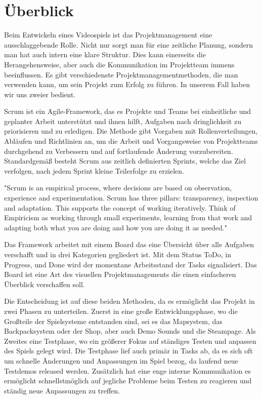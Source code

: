 
\section{Überblick}\label{sec:ueberblick}

\renewcommand{\kapitelautor}{Autor: Nils} %

%
Beim Entwickeln eines Videospiels ist das Projektmanagement eine ausschlaggebende Rolle. Nicht nur sorgt man für eine zeitliche Planung, sondern man hat auch intern eine klare Struktur.
Dies kann einerseits die Herangehensweise, aber auch die Kommunikation im Projektteam immens beeinflussen. Es gibt verschiedenste Projektmanagementmethoden, die man verwenden kann, um sein Projekt zum Erfolg zu führen.
In unserem Fall haben wir uns zweier bedient.

Scrum ist ein Agile-Framework, das es Projekte und Teams bei einheitliche und geplanter Arbeit unterstützt und ihnen hilft, Aufgaben nach dringlichkeit zu priorisieren und zu erledigen.
Die Methode gibt Vorgaben mit Rollenverteilungen, Abläufen und Richtlinien an, um die Arbeit und Vorgangsweise von Projektteams durchgehend zu Verbessern und auf fortlaufende Änderung vorzubereiten.
Standardgemäß besteht Scrum aus zeitlich definierten Sprints, welche das Ziel verfolgen, nach jedem Sprint kleine Teilerfolge zu erzielen.

"Scrum is an empirical process, where decisions are based on observation, experience and experimentation. 
Scrum has three pillars: transparency, inspection and adaptation. This supports the concept of working iteratively. 
Think of Empiricism as working through small experiments, learning from that work and adapting both what you are doing and how you are doing it as needed."\cite{Scrum}


Das Framework arbeitet mit einem Board das eine Übersicht über alle Aufgaben verschafft und in drei Kategorien gegliedert ist.
Mit dem Status ToDo, in Progress, und Done wird der momentane Arbeitsstand der Tasks signalisiert. Das Board ist eine Art des visuellen Projektmanagements die einen einfacheren Überblick verschaffen soll.\cite{AsanaKanban}

 Die Entscheidung ist auf diese beiden Methoden, da es ermöglicht das Projekt in zwei Phasen zu unterteilen.
Zuerst in eine große Entwicklungsphase, wo die Großteile der Spielsysteme entstanden sind, sei es das Mapsystem, das Backpacksystem oder der Shop, aber auch Demo Sounds und die Steampage.
Als Zweites eine Testphase, wo ein größerer Fokus auf ständiges Testen und anpassen des Spiels gelegt wird.
Die Testphase lief auch primär in Tasks ab, da es sich oft um schnelle Änderungen und Anpassungen im Spiel bezog, da laufend neue Testdemos released werden.
Zusätzlich hat eine enge interne Kommunikation es ermöglicht schnellstmöglich auf jegliche Probleme beim Testen zu reagieren und ständig neue Anpassungen zu treffen.
%

\renewcommand{\kapitelautor}{}
